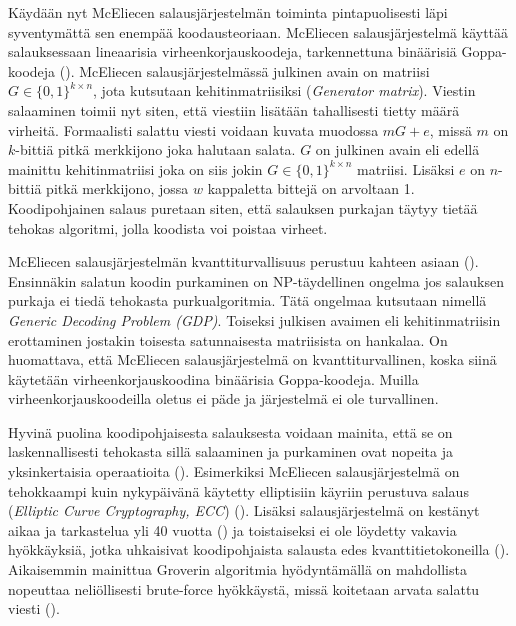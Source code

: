 Käydään nyt McEliecen salausjärjestelmän toiminta pintapuolisesti läpi syventymättä sen enempää koodausteoriaan. McEliecen salausjärjestelmä käyttää salauksessaan lineaarisia virheenkorjauskoodeja, tarkennettuna binäärisiä Goppa-koodeja (\cite{8012331}). McEliecen salausjärjestelmässä julkinen avain on matriisi $G \in \{0, 1\}^{k \times n}$, jota kutsutaan kehitinmatriisiksi (\emph{Generator matrix}). Viestin salaaminen toimii nyt siten, että viestiin lisätään tahallisesti tietty määrä virheitä. Formaalisti salattu viesti voidaan kuvata muodossa $mG+e$, missä $m$ on $k$-bittiä pitkä merkkijono joka halutaan salata. $G$ on julkinen avain eli edellä mainittu kehitinmatriisi joka on siis jokin $G \in \{0, 1\}^{k \times n}$ matriisi. Lisäksi $e$ on $n$-bittiä pitkä merkkijono, jossa $w$ kappaletta bittejä on arvoltaan 1. Koodipohjainen salaus puretaan siten, että salauksen purkajan täytyy tietää tehokas algoritmi, jolla koodista voi poistaa virheet.

McEliecen salausjärjestelmän kvanttiturvallisuus perustuu kahteen asiaan (\cite{8012331}). Ensinnäkin salatun koodin purkaminen on NP-täydellinen ongelma jos salauksen purkaja ei tiedä tehokasta purkualgoritmia. Tätä ongelmaa kutsutaan nimellä \emph{Generic Decoding Problem (GDP)}. Toiseksi julkisen avaimen eli kehitinmatriisin erottaminen jostakin toisesta satunnaisesta matriisista on hankalaa. On huomattava, että McEliecen salausjärjestelmä on kvanttiturvallinen, koska siinä käytetään virheenkorjauskoodina binäärisia Goppa-koodeja. Muilla virheenkorjauskoodeilla oletus ei päde ja järjestelmä ei ole turvallinen.

Hyvinä puolina koodipohjaisesta salauksesta voidaan mainita, että se on laskennallisesti tehokasta sillä salaaminen ja purkaminen ovat nopeita ja yksinkertaisia operaatioita (\cite{overbeck2009code}). Esimerkiksi McEliecen salausjärjestelmä on tehokkaampi kuin nykypäivänä käytetty elliptisiin käyriin perustuva salaus (\emph{Elliptic Curve Cryptography, ECC}) (\cite{bernstein2017post}). Lisäksi salausjärjestelmä on kestänyt aikaa ja tarkastelua yli 40 vuotta (\cite{8012331}) ja toistaiseksi ei ole löydetty vakavia hyökkäyksiä, jotka uhkaisivat koodipohjaista salausta edes kvanttitietokoneilla (\cite{overbeck2009code}). Aikaisemmin mainittua Groverin algoritmia hyödyntämällä on mahdollista nopeuttaa neliöllisesti brute-force hyökkäystä, missä koitetaan arvata salattu viesti (\cite{bernstein2017post}).

